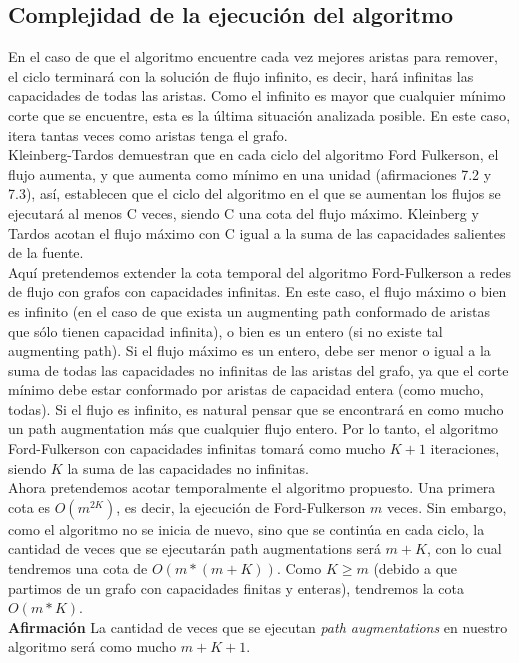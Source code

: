 \documentclass{article}
\begin{document}
\subsection{Complejidad de la ejecución del algoritmo}
En el caso de que el algoritmo encuentre cada vez mejores aristas para remover, el ciclo terminará con la solución de flujo infinito, es decir, hará infinitas las capacidades de todas las aristas. Como el infinito es mayor que cualquier mínimo corte que se encuentre, esta es la última situación analizada posible. En este caso, itera tantas veces como aristas tenga el grafo.\\

Kleinberg-Tardos demuestran que en cada ciclo del algoritmo Ford Fulkerson, el flujo aumenta, y que aumenta como mínimo en una unidad (afirmaciones 7.2 y 7.3), así, establecen que el ciclo del algoritmo en el que se aumentan los flujos se ejecutará al menos C veces, siendo C una cota del flujo máximo. Kleinberg y Tardos acotan el flujo máximo con C igual a la suma de las capacidades salientes de la fuente.\\
Aquí pretendemos extender la cota temporal del algoritmo Ford-Fulkerson a redes de flujo con grafos con capacidades infinitas. En este caso, el flujo máximo o bien es infinito (en el caso de que exista un augmenting path conformado de aristas que sólo tienen capacidad infinita), o bien es un entero (si no existe tal augmenting path). Si el flujo máximo es un entero, debe ser menor o igual a la suma de todas las capacidades no infinitas de las aristas del grafo, ya que el corte mínimo debe estar conformado por aristas de capacidad entera (como mucho, todas). Si el flujo es infinito, es natural pensar que se encontrará en como mucho un path augmentation más que cualquier flujo entero. Por lo tanto, el algoritmo Ford-Fulkerson con capacidades infinitas tomará como mucho $K+1$ iteraciones, siendo $K$ la suma de las capacidades no infinitas.\\
Ahora pretendemos acotar temporalmente el algoritmo propuesto. Una primera cota es $O(m^{2K})$, es decir, la ejecución de Ford-Fulkerson $m$ veces. Sin embargo, como el algoritmo no se inicia de nuevo, sino que se continúa en cada ciclo, la cantidad de veces que se ejecutarán path augmentations será $m+K$, con lo cual tendremos una cota de $O(m*(m+K))$. Como $K\geq m$ (debido a que partimos de un grafo con capacidades finitas y enteras), tendremos la cota $O(m*K)$.\\

\textbf{Afirmación} La cantidad de veces que se ejecutan \textit{path augmentations} en nuestro algoritmo será como mucho $m+K+1$.\\
\end{document}

